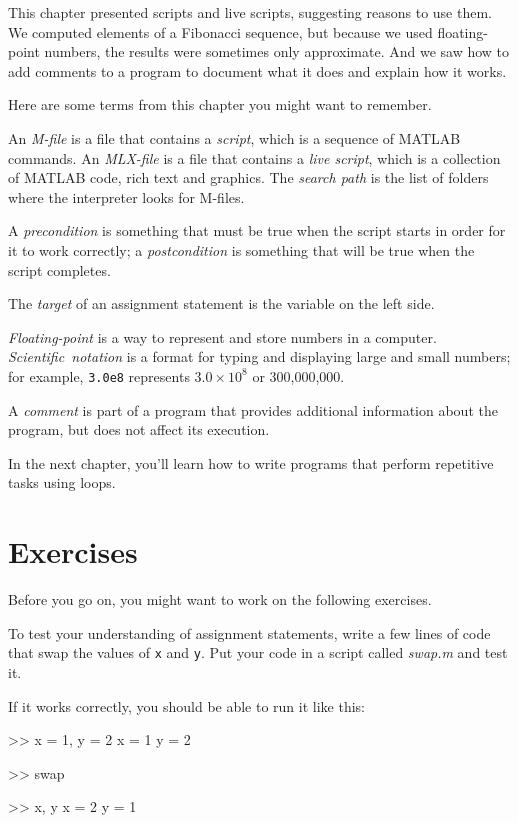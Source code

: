 \documentclass[../../book.tex]{subfiles}
\begin{document}
This chapter presented scripts and live scripts, suggesting reasons to use them.  We computed elements of a Fibonacci sequence, but because we used floating-point numbers, the results were sometimes only approximate.
And we saw how to add comments to a program to document what it does and explain how it works.

Here are some terms from this chapter you might want to remember.

An \emph{M-file} is a file that contains a \emph{script}, which is a sequence of MATLAB commands.
An \emph{MLX-file} is a file that contains a \emph{live script}, which is a collection of MATLAB code, rich text and graphics.
The \emph{search path} is the list of folders where the interpreter looks for
M-files.

A \emph{precondition} is something that must be true when the script
starts in order for it to work correctly; a \emph{postcondition} is something that will be true when the script completes.

The \emph{target} of an assignment statement is the variable on the left side.

\emph{Floating-point} is a way to represent and store numbers in a computer.
\mbox{\emph{Scientific notation}} is a format for typing and displaying large
and small numbers; for example, \lstinline{3.0e8} represents $3.0 \times 10^8$
or 300,000,000.

A \emph{comment} is part of a program that provides additional information
about the program, but does not affect its execution.

In the next chapter, you'll learn how to write programs that perform repetitive tasks using loops.


\section{Exercises}

Before you go on, you might want to work on the following exercises.

\begin{ex}
To test your understanding of assignment statements, write a few lines of code that swap the values of \lstinline{x} and \lstinline{y}.
Put your code in a script called \emph{swap.m} and test it.

If it works correctly, you should be able to run it like this:

\begin{code}
>> x = 1, y = 2
x = 1
y = 2

>> swap

>> x, y
x = 2
y = 1
\end{code}
\end{ex}
\end{document}
